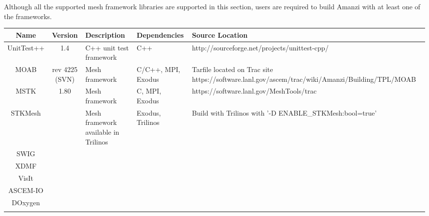 \documentclass[12pt]{article}
\begin{document}
Although all the supported mesh framework libraries are supported in this section, users are required to build
Amanzi with at least one of the frameworks. 

\begin{table}[htdp]
\begin{center}
\begin{tabular}{|c|c|p{3cm}|p{3cm}|p{3cm}|}
\hline
\hline
Name & Version & Description & Dependencies & Source Location \\
\hline
UnitTest++ & 1.4 & C++ unit test framework & C++ & http://sourceforge.net/projects/unittest-cpp/ \\
\hline
MOAB & rev 4225 (SVN) & Mesh framework & C/C++, MPI, Exodus & Tarfile located on Trac site https://software.lanl.gov/ascem/trac/wiki/Amanzi/Building/TPL/MOAB  \\
\hline
MSTK & 1.80 & Mesh framework & C, MPI, Exodus & https://software.lanl.gov/MeshTools/trac\\
\hline
STKMesh & & Mesh framework available in Trilinos & Exodus, Trilinos & Build with Trilinos with '-D ENABLE\_STKMesh:bool=true'  \\
\hline
SWIG &&&& \\
\hline
XDMF &&&& \\
\hline
VisIt &&&& \\
\hline
ASCEM-IO &&&& \\
\hline
DOxygen &&&& \\

&&&& \\
\hline


\end{tabular}
\end{center}
\label{default}
\end{table}%
\end{document}
